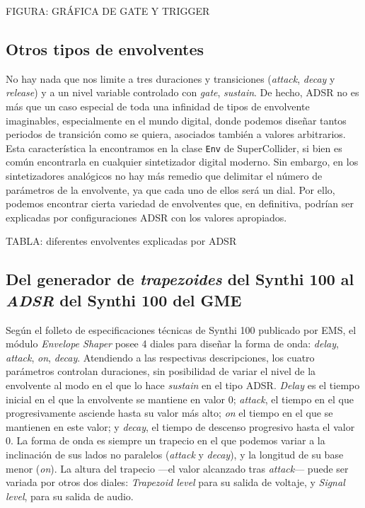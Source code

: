 FIGURA: GRÁFICA DE GATE Y TRIGGER

\subsection{Otros tipos de envolventes}

No hay nada que nos limite a tres duraciones y transiciones (\textit{attack}, \textit{decay} y \textit{release}) y a un nivel variable controlado con \textit{gate}, \textit{sustain}. De hecho, ADSR no es más que un caso especial de toda una infinidad de tipos de envolvente imaginables, especialmente en el mundo digital, donde podemos diseñar tantos periodos de transición como se quiera, asociados también a valores arbitrarios. Esta característica la encontramos en la clase \texttt{Env} de SuperCollider, si bien es común encontrarla en cualquier sintetizador digital moderno. Sin embargo, en los sintetizadores analógicos no hay más remedio que delimitar el número de parámetros de la envolvente, ya que cada uno de ellos será un dial. Por ello, podemos encontrar cierta variedad de envolventes que, en definitiva, podrían ser explicadas por configuraciones ADSR con los valores apropiados. 

TABLA: diferentes envolventes explicadas por ADSR

\subsection{Del generador de \textit{trapezoides} del Synthi 100 al \textit{ADSR} del Synthi 100 del GME}

Según el folleto de especificaciones técnicas de Synthi 100 publicado por EMS, el módulo \textit{Envelope Shaper} posee 4 diales para diseñar la forma de onda: \textit{delay}, \textit{attack}, \textit{on}, \textit{decay}. Atendiendo a las respectivas descripciones, los cuatro parámetros controlan duraciones, sin posibilidad de variar el nivel de la envolvente al modo en el que lo hace \textit{sustain} en el tipo ADSR. \textit{Delay} es el tiempo inicial en el que la envolvente se mantiene en valor 0; \textit{attack}, el tiempo en el que progresivamente asciende hasta su valor más alto; \textit{on} el tiempo en el que se mantienen en este valor; y \textit{decay}, el tiempo de descenso progresivo hasta el valor 0. La forma de onda es siempre un trapecio en el que podemos variar a la inclinación de sus lados no paralelos (\textit{attack} y \textit{decay}), y la longitud de su base menor (\textit{on}). La altura del trapecio ---el valor alcanzado tras \textit{attack}--- puede ser variada por otros dos diales: \textit{Trapezoid level} para su salida de voltaje, y \textit{Signal level}, para su salida de audio.

